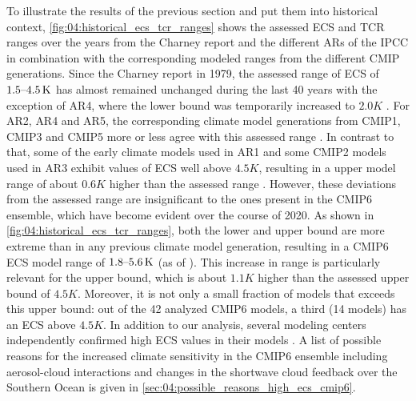 To illustrate the results of the previous section and put them into historical
context, \cref{fig:04:historical_ecs_tcr_ranges} shows the assessed \ac{ECS}
and \ac{TCR} ranges over the years from the Charney report
\autocite{Charney1979} and the different \acp{AR} of the \ac{IPCC} in
combination with the corresponding modeled ranges from the different \ac{CMIP}
generations. Since the Charney report in 1979, the assessed range of \ac{ECS}
of $\range{1.5}{4.5} \unit{K}$ has almost remained unchanged during the last 40
years \autocite{Charney1979, Mitchell1990, Kattenberg1996, Albritton2001,
  Stocker2013} with the exception of \acs{AR}4, where the lower bound was
temporarily increased to $2.0 \unit{K}$ \autocite{Solomon2007}. For \acs{AR}2,
\acs{AR}4 and \acs{AR}5, the corresponding climate model generations from
\acs{CMIP}1, \acs{CMIP}3 and \acs{CMIP}5 more or less agree with this assessed
range \autocite{Kattenberg1996, Randall2007, Flato2013}. In contrast to that,
some of the early climate models used in \acs{AR}1 and some \acs{CMIP}2 models
used in \acs{AR}3 exhibit values of \acs{ECS} well above $4.5 \unit{K}$,
resulting in a upper model range of about $0.6 \unit{K}$ higher than the
assessed range \autocite{Mitchell1990, Cubasch2001}. However, these deviations
from the assessed range are insignificant to the ones present in the
\acs{CMIP}6 ensemble, which have become evident over the course of 2020. As
shown in \cref{fig:04:historical_ecs_tcr_ranges}, both the lower and upper
bound are more extreme than in any previous climate model generation, resulting
in a \acs{CMIP}6  \ac{ECS} model range of $\range{1.8}{5.6} \unit{K}$ (as of
\TheMonth{}). This increase in range is particularly relevant for the upper
bound, which is about $1.1 \unit{K}$ higher than the assessed upper bound of
$4.5 \unit{K}$. Moreover, it is not only a small fraction of models that
exceeds this upper bound: out of the 42 analyzed \ac{CMIP}6 models, a third (14
models) has an \ac{ECS} above $4.5 \unit{K}$. In addition to our analysis,
several modeling centers independently confirmed high \ac{ECS} values in their
models \autocite{Andrews2019, Gettelman2019, Wyser2020}. A list of possible
reasons for the increased climate sensitivity in the \acs{CMIP}6 ensemble
including aerosol-cloud interactions and changes in the shortwave cloud
feedback over the Southern Ocean is given in
\cref{sec:04:possible_reasons_high_ecs_cmip6}.


